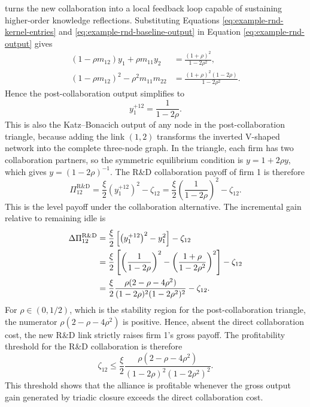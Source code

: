 turns the new collaboration into a local feedback loop capable of sustaining
higher-order knowledge reflections. Substituting Equations \eqref{eq:example-rnd-kernel-entries} and
\eqref{eq:example-rnd-baseline-output} in Equation
\eqref{eq:example-rnd-output} gives
\begin{align}
(1-\rho m_{12})y_{1}
+
\rho m_{11}y_{2}
&=
\frac{(1+\rho)^2}{1-2\rho^2},
\label{eq:example-rnd-numerator}
\\
(1-\rho m_{12})^2
-
\rho^2m_{11}m_{22}
&=
\frac{(1+\rho)^2(1-2\rho)}{1-2\rho^2}.
\label{eq:example-rnd-denominator}
\end{align}
Hence the post-collaboration output simplifies to
\begin{equation}
y_{1}^{+12}
=
\frac{1}{1-2\rho}.
\label{eq:example-rnd-post-output-exact}
\end{equation}
This is also the Katz--Bonacich output of any node in the post-collaboration triangle,
because adding the link $(1,2)$ transforms the inverted V-shaped network into the complete
three-node graph. In the triangle, each firm has two collaboration partners, so the
symmetric equilibrium condition is
$
y
=
1+2\rho y$, which gives $y=(1-2\rho)^{-1}$. The R\&D collaboration payoff of firm 1 is therefore
\begin{equation}
\Pi_{12}^{\mathrm{R\&D}}
=
\frac{\xi}{2}
\left(y_{1}^{+12}\right)^2
-
\zeta_{12}
=
\frac{\xi}{2}
\left(
\frac{1}{1-2\rho}
\right)^2
-
\zeta_{12}.
\label{eq:example-rnd-profit-level}
\end{equation}
This is the level payoff under the collaboration alternative. The incremental gain
relative to remaining idle is
\begin{align}
\Delta\Pi_{12}^{\mathrm{R\&D}}
&=
\frac{\xi}{2}
\left[
\left(y_{1}^{+12}\right)^2
-
y_{1}^2
\right]
-
\zeta_{12}
\notag\\
&=
\frac{\xi}{2}
\left[
\left(
\frac{1}{1-2\rho}
\right)^2
-
\left(
\frac{1+\rho}{1-2\rho^2}
\right)^2
\right]
-
\zeta_{12} \notag\\
& =
\frac{\xi}{2}
\frac{
\rho(2-\rho-4\rho^2)
}{
(1-2\rho)^2(1-2\rho^2)^2
}
-
\zeta_{12}.
\label{eq:example-rnd-incremental-profit}
\end{align}
For $\rho\in(0,1/2)$, which is the stability region for the post-collaboration
triangle, the numerator $\rho(2-\rho-4\rho^2)$ is positive. Hence, absent the direct
collaboration cost, the new R\&D link strictly raises firm 1's gross payoff. The profitability threshold for the R\&D collaboration is therefore
\begin{equation}
\zeta_{12}
\le
\frac{\xi}{2}
\frac{
\rho(2-\rho-4\rho^2)
}{
(1-2\rho)^2(1-2\rho^2)^2
}.
\label{eq:example-rnd-profitability-threshold}
\end{equation}
This threshold shows that the alliance is profitable whenever the
gross output gain generated by triadic closure exceeds the direct collaboration cost. 

